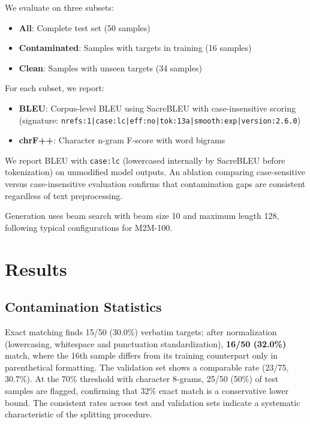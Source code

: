 \documentclass[11pt,a4paper]{article}
\begin{document}
We evaluate on three subsets:
\begin{itemize}
    \item \textbf{All}: Complete test set (50 samples)
    \item \textbf{Contaminated}: Samples with targets in training (16 samples)
    \item \textbf{Clean}: Samples with unseen targets (34 samples)
\end{itemize}

For each subset, we report:
\begin{itemize}
    \item \textbf{BLEU}: Corpus-level BLEU using SacreBLEU \citep{post2018call} with case-insensitive scoring (signature: \texttt{nrefs:1|\allowbreak case:lc|\allowbreak eff:no|\allowbreak tok:13a|\allowbreak smooth:exp|\allowbreak version:2.6.0})
    \item \textbf{chrF++}: Character n-gram F-score with word bigrams \citep{popovic2015chrf}
\end{itemize}

We report BLEU with \texttt{case:lc} (lowercased internally by SacreBLEU before tokenization) on unmodified model outputs. An ablation comparing case-sensitive versus case-insensitive evaluation confirms that contamination gaps are consistent regardless of text preprocessing.

Generation uses beam search with beam size 10 and maximum length 128, following typical configurations for M2M-100.

\section{Results}
\label{sec:results}

\subsection{Contamination Statistics}
\label{sec:results-contamination}

Exact matching finds 15/50 (30.0\%) verbatim targets; after normalization (lowercasing, whitespace and punctuation standardization), \textbf{16/50 (32.0\%)} match, where the 16th sample differs from its training counterpart only in parenthetical formatting. The validation set shows a comparable rate (23/75, 30.7\%). At the 70\% threshold with character 8-grams, 25/50 (50\%) of test samples are flagged, confirming that 32\% exact match is a conservative lower bound. The consistent rates across test and validation sets indicate a systematic characteristic of the splitting procedure.
\end{document}
